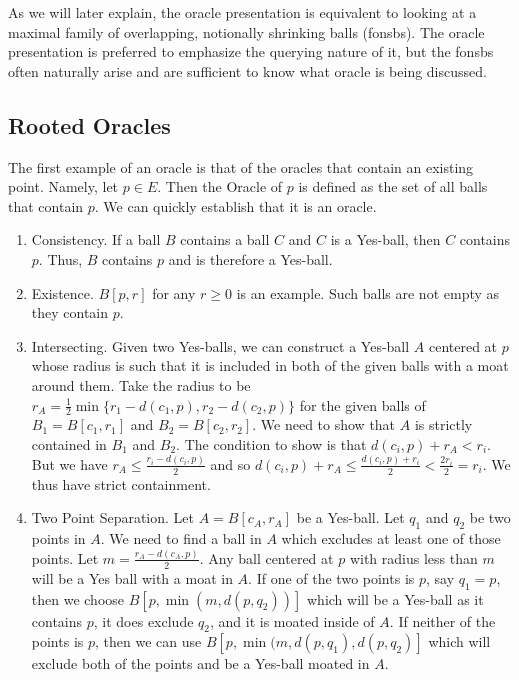 \documentclass[12pt]{article}
\begin{document}
As we will later explain, the oracle presentation is equivalent to looking at a maximal family of overlapping, notionally shrinking balls (fonsbs). The oracle presentation is preferred to emphasize the querying nature of it, but the fonsbs often naturally arise and are sufficient to know what oracle is being discussed. 

\subsection{Rooted Oracles}

The first example of an oracle is that of the oracles that contain an existing point. Namely, let $p \in E$. Then the Oracle of $p$ is defined as the set of all balls that contain $p$. We can quickly establish that it is an oracle.

\begin{enumerate}
    \item Consistency. If a ball $B$ contains a ball $C$ and $C$ is a Yes-ball, then $C$ contains $p$. Thus, $B$ contains $p$ and is therefore a Yes-ball. 
    \item Existence. $B[p, r]$ for any $r \geq 0$ is an example. Such balls are not empty as they contain $p$. 
    \item Intersecting. Given two Yes-balls, we can construct a Yes-ball $A$ centered at $p$ whose radius is such that it is included in both of the given balls with a moat around them. Take the radius to be $r_A = \frac{1}{2}\min\{r_1 - d(c_1, p), r_2 - d(c_2, p)\}$ for the given balls of $B_1 = B[c_1, r_1]$ and $B_2 = B[c_2, r_2]$. We need to show that $A$ is strictly contained in $B_1$ and $B_2$. The condition to show is that $d(c_i, p) + r_A < r_i$. But we have $r_A \leq \frac{r_i - d(c_i, p)}{2}$ and so $d(c_i, p) + r_A \leq \frac{d(c_i, p) + r_i}{2} < \frac{2 r_i}{2} = r_i$. We thus have strict containment. 
    \item Two Point Separation. Let $A = B[c_A, r_A]$ be a Yes-ball. Let $q_1$ and $q_2$ be two points in $A$. We need to find a ball in $A$ which excludes at least one of those points. Let $m = \frac{ r_A - d(c_A, p)}{2}$. Any ball centered at $p$ with radius less than $m$ will be a Yes ball with a moat in $A$. If one of the two points is $p$, say $q_1 = p$, then we choose $B[p, \min(m, d(p, q_2))]$ which will be a Yes-ball as it contains $p$, it does exclude $q_2$, and it is moated inside of $A$. If neither of the points is $p$, then we can use $B[p, \min(m, d(p, q_1), d(p, q_2)]$ which will exclude both of the points and be a Yes-ball moated in $A$. 
\end{enumerate}
\end{document}
